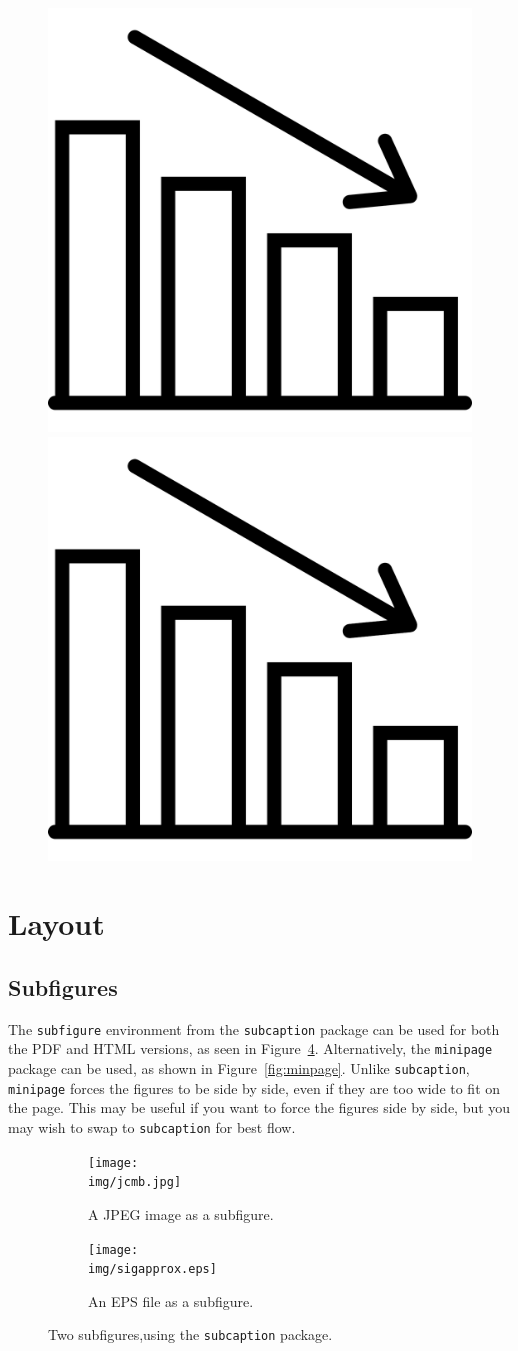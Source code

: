 \begin{figure}[H]
    \centering
    \iflatexml
        \includegraphics[width=0.25\linewidth]{img/graph.svg}
    \else
        \includegraphics[width=0.25\linewidth]{img/graph.pdf}
    \fi
    \label{fig:graph}
\end{figure}



\section{Layout}
\label{demo:layout}

\subsection{Subfigures}
\label{demo:fig:subfig}

The \texttt{subfigure} environment from the \texttt{subcaption} package can be used for both the PDF and HTML versions, as seen in Figure~\ref{fig:subs}. Alternatively, the \texttt{minipage} package can be used, as shown in Figure~\ref{fig:minpage}. Unlike \texttt{subcaption}, \texttt{minipage} forces the figures to be side by side, even if they are too wide to fit on the page. This may be useful if you want to force the figures side by side, but you may wish to swap to \texttt{subcaption} for best flow. 

\begin{figure}[H]
    \centering
    \begin{subfigure}{0.35\textwidth}
        \texttt{[image: \\img/jcmb.jpg]}
        \caption{A JPEG image as a subfigure.}
        \label{fig:jcmb}
    \end{subfigure}
    \hfill
    \begin{subfigure}{0.6\textwidth}
        \texttt{[image: \\img/sigapprox.eps]}
        \caption{An EPS file as a subfigure.}
        \label{fig:sig}
    \end{subfigure}
    \caption{Two subfigures,using the \texttt{subcaption} package.}
    \label{fig:subs}
\end{figure}



